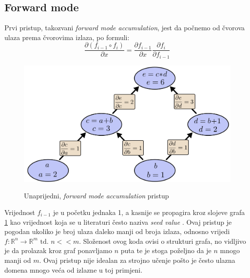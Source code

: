 \documentclass[zavrsnirad]{fer}
\begin{document}
\subsection{Forward mode}
Prvi pristup, takozvani \textit{forward mode accumulation}, jest da počnemo od čvorova ulaza prema čvorovima izlaza, po formuli:
\begin{equation}
  \frac{\partial (f_{i-1} \circ f_i)}{\partial x} = \frac{\partial f_{i-1}}{\partial x} \frac{\partial f_i}{\partial f_{i-1}}
\end{equation}
\begin{figure}[h]
  \centering
  \includegraphics[width=0.7\linewidth]{"./slike/forward_graph.png"}
  \caption{Unaprijedni, \textit{forward mode accumulation} pristup}
  \cite{wuciawe_github}
  \label{slk:forward_graph}
\end{figure}
Vrijednost $f_{i-1}$ je u početku jednaka 1, a kasnije se propagira kroz slojeve grafa \ref{slk:forward_graph} kao vrijednost koja se u literaturi često naziva \textit{seed value} \cite{prague:diffcpp}. Ovaj pristup je pogodan ukoliko je broj ulaza daleko manji od broja izlaza, odnosno vrijedi $f\colon \mathbb{R}^n \rightarrow \mathbb{R}^m \text{ td. } n << m$. Složenost ovog koda ovisi o strukturi grafa, no vidljivo je da prolazak kroz graf ponavljamo $n$ puta te je stoga poželjno da je $n$ mnogo manji od $m$. Ovaj pristup nije idealan za strojno učenje pošto je često ulazna domena mnogo veća od izlazne u toj primjeni.
\\
\end{document}

